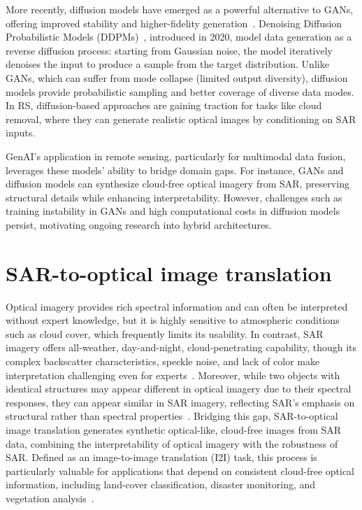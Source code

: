 More recently, diffusion models have emerged as a powerful alternative to GANs, offering improved stability and higher-fidelity generation~\cite{c_diffusion_s2o}. Denoising Diffusion Probabilistic Models (DDPMs)~\cite{DDPM_2020}, introduced in 2020, model data generation as a reverse diffusion process: starting from Gaussian noise, the model iteratively denoises the input to produce a sample from the target distribution. Unlike GANs, which can suffer from mode collapse (limited output diversity), diffusion models provide probabilistic sampling and better coverage of diverse data modes. In RS, diffusion-based approaches are gaining traction for tasks like cloud removal, where they can generate realistic optical images by conditioning on SAR inputs.

GenAI's application in remote sensing, particularly for multimodal data fusion, leverages these models' ability to bridge domain gaps. For instance, GANs and diffusion models can synthesize cloud-free optical imagery from SAR, preserving structural details while enhancing interpretability. However, challenges such as training instability in GANs and high computational costs in diffusion models persist, motivating ongoing research into hybrid architectures.

\section{SAR-to-optical image translation}
Optical imagery provides rich spectral information and can often be interpreted without expert knowledge, but it is highly sensitive to atmospheric conditions such as cloud cover, which frequently limits its usability. In contrast, SAR imagery offers all-weather, day-and-night, cloud-penetrating capability, though its complex backscatter characteristics, speckle noise, and lack of color make interpretation challenging even for experts~\cite{s2o_color_super_diff}. Moreover, while two objects with identical structures may appear different in optical imagery due to their spectral responses, they can appear similar in SAR imagery, reflecting SAR’s emphasis on structural rather than spectral properties~\cite{RS_Data_Fusion_GANs_sota}. Bridging this gap, SAR-to-optical image translation generates synthetic optical-like, cloud-free images from SAR data, combining the interpretability of optical imagery with the robustness of SAR. Defined as an image-to-image translation (I2I) task, this process is particularly valuable for applications that depend on consistent cloud-free optical information, including land-cover classification, disaster monitoring, and vegetation analysis~\cite{CR_SEN2_dRNN}.

